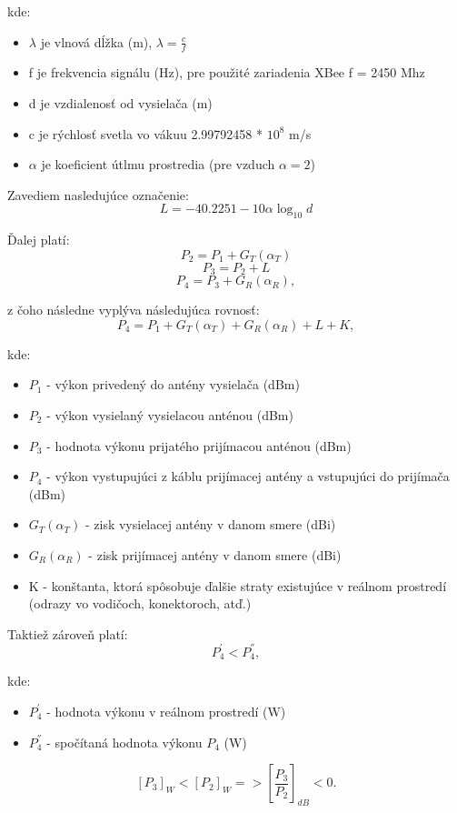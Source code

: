 \documentclass[11pt,twoside,a4paper]{book}
\begin{document}
kde:
\begin{itemize}
 \item $\lambda$ je vlnová dĺžka (m), $\lambda = \frac{c}{f}$
 \item f je frekvencia signálu (Hz), pre použité zariadenia XBee f = 2450 Mhz
 \item d je vzdialenosť od vysielača (m)
 \item c je rýchlosť svetla vo vákuu 2.99792458 * $10^{8}$ m/s
 \item $\alpha$ je koeficient útlmu prostredia (pre vzduch $\alpha = 2$)
\end{itemize}

Zavediem nasledujúce označenie:
$$L = -40.2251 - 10\alpha\log_{10}d$$

Ďalej platí:
\[
P_{2} = P_{1} + G_{T}(\alpha_{T}) \]
\[
P_{3} = P_{2} + L \]
\[
P_{4} = P_{3} + G_{R}(\alpha_{R}), \]

z čoho následne vyplýva následujúca rovnosť:
$$
P_{4} = P_{1} + G_{T}(\alpha_{T}) + G_{R}(\alpha_{R}) + L + K,
$$

kde:
\begin{itemize}
 \item $P_{1}$ - výkon privedený do antény vysielača (dBm)
 \item $P_{2}$ - výkon vysielaný vysielacou anténou (dBm)
 \item $P_{3}$ - hodnota výkonu prijatého prijímacou anténou (dBm)
 \item $P_{4}$ - výkon vystupujúci z káblu prijímacej antény a vstupujúci do prijímača (dBm)
 \item $G_{T}(\alpha_{T})$ - zisk vysielacej antény v danom smere (dBi)
 \item $G_{R}(\alpha_{R})$ - zisk prijímacej antény v danom smere (dBi)
 \item K - konštanta, ktorá spôsobuje ďalšie straty existujúce v reálnom prostredí (odrazy vo vodičoch, konektoroch, atď.)
\end{itemize}

Taktiež zároveň platí:
$$
P_{4}^{'} < P_{4}^{''},
$$

kde:
\begin{itemize}
 \item $P_{4}^{'}$ - hodnota výkonu v reálnom prostredí (W) 
 \item $P_{4}^{''}$ - spočítaná hodnota výkonu $P_{4}$ (W)
\end{itemize}

$$
\left[P_{3}\right]_{W} < \left[P_{2}\right]_{W} => \left[\frac{P_{3}}{P_{2}}\right]_{dB} < 0.
$$
\end{document}
